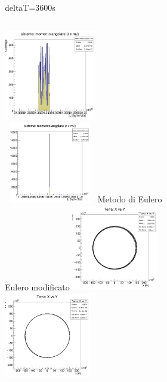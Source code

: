         \begin{frame}{deltaT=3600s}
            \begin{columns}
                \centering
                \includegraphics[width=4cm,height=4cm]{2_approx/L_2_0.jpg}\\
                \includegraphics[width=4cm,height=3.5cm]{2_approx/L1_2.jpg}
                \label{cfr::L1}
                \centering
                Metodo di Eulero\\
                \vspace{2cm}
                Eulero modificato
                \centering
                \includegraphics[width=3.75cm,height=3.75cm]{2_approx/terraxy_0_5.jpg}\\
                \includegraphics[width=3.75cm,height=3.75cm]{2_approx/terraxy_1_5.jpg}
                \label{cfr::xy1}
            \end{columns}
        \end{frame}
        
